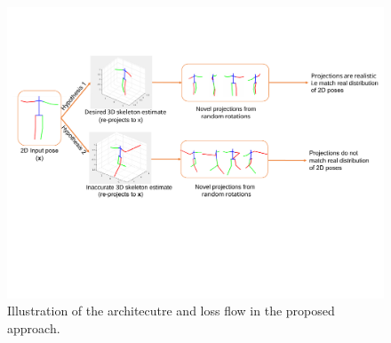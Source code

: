 \begin{figure}[h]
    \centering
    \includegraphics[width=\textwidth]{figures/h36_viz/novel_view_contraint.pdf}
    \caption{Illustration of the architecutre and loss flow in the proposed approach.}
    \label{fig:novel_view_constraint}
\end{figure}


